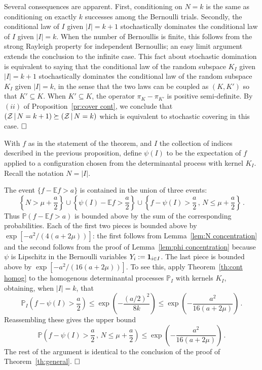 \documentclass[10pt]{article}
\theoremstyle{plain}
\theoremstyle{remark}
\def\Cox{\qed}
\def\E{{\mathbb E}}
\def\P{{\mathbb P}}
\def\Cox{\hfill \Box}
\def\one{{\bf 1}}
\def\|{{\, | \, }}
\def\ZZ{{\cal Z}}
\def\mean{\mu}
\begin{document}
Several consequences are apparent.  First, conditioning on
$N = k$ is the same as conditioning on exactly $k$ successes
among the Bernoulli trials.  Secondly, the conditional law of $I$
given $|I| = k+1$ stochastically dominates the conditional
law of $I$ given $|I| = k$.  When the number of Bernoullis
is finite, this follows from the strong Rayleigh property
for independent Bernoullis; an easy limit argument extends
the conclusion to the infinite case.  This fact about stochastic
domination is equivalent to saying
that the conditional law of the random subspace $K_I$ given
$|I| = k+1$ stochastically dominates the conditional law
of the random subspace $K_I$ given $|I| = k$, in the
sense that the two laws can be coupled as $(K , K')$
so that $K' \subseteq K$.  When $K' \subseteq K$,
the operator $\pi_{K} - \pi_{K'}$ is positive semi-definite.
By~$(ii)$ of Proposition~\ref{pr:cover cont}, we conclude that
$(\ZZ \| N = k+1) \succeq (\ZZ \| N = k)$ which is equivalent
to stochastic covering in this case.
$\Cox$


With $f$ as in the statement of the theorem, and $I$ the collection of indices described in the previous proposition, define
$\psi(I)$ to be the expectation of $f$ applied to a configuration chosen from the determinantal process with kernel $K_I$. Recall the notation $N=|I|$.

The event $\{ f - \E f > a \}$ is contained in the union of three events:
$$\left \{ N > \mean + \frac{a}{2} \right \} \cup
   \left \{ \psi(I) - \E f > \frac{a}{2} \right \} \cup
   \left \{ f - \psi(I) > \frac{a}{2} \, , \, N \leq \mean +
      \frac{a}{2} \right \}  \, .$$
Thus $\P (f - \E f > a)$ is bounded above by the sum of the
corresponding probabilities.  Each of the first two pieces is
bounded above by $\exp [- a^2 / (4(a + 2\mean))]$: the first
follows from Lemma~\ref{lem:N concentration} and the second
follows from the proof of Lemma~\ref{lem:phi concentration} because $\psi$ is Lipschitz in the Bernoulli variables $Y_i:=\one_{i\in I}$.
  The last piece is bounded above
by $\exp [- a^2 / (16 (a + 2\mean))]$.  To see this, apply Theorem~\ref{th:cont homog} to the homogenous determinantal processes $\P_I$ with kernels $K_I$, obtaining, when $|I|=k$, that
$$\P_I \left ( f - \psi(I) > \frac{a}{2} \right )
   \leq \exp \left ( - \frac{(a/2)^2}{8 k} \right )
   \leq \exp \left ( - \frac{a^2}{16 (a + 2 \mean)} \right ) \, .$$
Reassembling these gives the upper bound
$$\P \left ( f - \psi(I) > \frac{a}{2} \, , \, N \leq \mean +
   \frac{a}{2} \right )
   \leq \exp \left ( -\frac{a^2}{16 (a + 2 \mean)} \right ) \, .$$
The rest of the argument is identical to the conclusion of the proof of Theorem~\ref{th:general}.
$\Cox$
\end{document}

